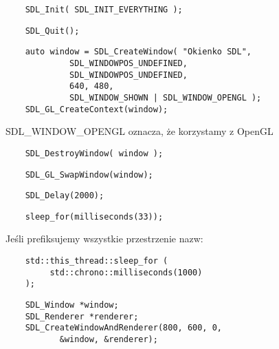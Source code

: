 \documentclass{beamer}
\begin{document}
\begin{frame}[fragile]
    \begin{verbatim}
    SDL_Init( SDL_INIT_EVERYTHING ); 
     \end{verbatim}
     \EB
    \begin{verbatim}
    SDL_Quit(); 
     \end{verbatim}
     \EB
\end{frame}
\begin{frame}[fragile]
    \begin{verbatim}
    auto window = SDL_CreateWindow( "Okienko SDL", 
             SDL_WINDOWPOS_UNDEFINED, 
             SDL_WINDOWPOS_UNDEFINED, 
             640, 480, 
             SDL_WINDOW_SHOWN | SDL_WINDOW_OPENGL ); 
    SDL_GL_CreateContext(window);
     \end{verbatim}
     SDL\_WINDOW\_OPENGL oznacza, że korzystamy z OpenGL
     \EB
    \begin{verbatim}
    SDL_DestroyWindow( window );
     \end{verbatim}
     \EB
\end{frame}
\begin{frame}[fragile]
    \begin{verbatim}
    SDL_GL_SwapWindow(window);
     \end{verbatim}
     \EB
\end{frame}
\begin{frame}[fragile]
    \begin{verbatim}
    SDL_Delay(2000);
     \end{verbatim}
     \EB
    \begin{verbatim}
    sleep_for(milliseconds(33));
     \end{verbatim}
     Jeśli prefiksujemy wszystkie przestrzenie nazw:
    \begin{verbatim}
    std::this_thread::sleep_for ( 
         std::chrono::milliseconds(1000)
    );
     \end{verbatim}
     \EB
\end{frame}
\begin{frame}[fragile]
    \begin{verbatim}
    SDL_Window *window;
    SDL_Renderer *renderer;
    SDL_CreateWindowAndRenderer(800, 600, 0, 
           &window, &renderer);
     \end{verbatim}
     \EB
\end{frame}
\end{document}
